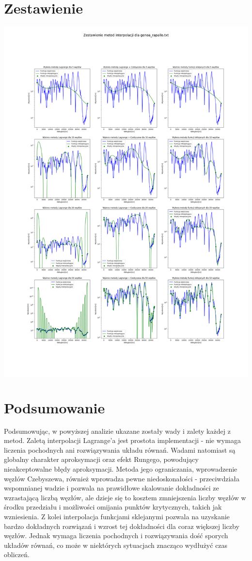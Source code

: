 \documentclass[a4paper,12pt]{article}
\begin{document}
\section{Zestawienie}
    \begin{center}
        \includegraphics[scale=0.3]{../charts/comparison_genoa_rapallo.png}
    \end{center}
    
\section{Podsumowanie}
	Podsumowując, w powyższej analizie ukazane zostały wady i zalety każdej z metod. Zaletą interpolacji Lagrange'a jest prostota implementacji - nie wymaga liczenia pochodnych ani rozwiązywania układu równań. Wadami natomiast są globalny charakter aproksymacji oraz efekt Rungego, powodujący nieakceptowalne błędy aproksymacji. Metoda jego ograniczania, wprowadzenie węzłów Czebyszewa, również wprowadza pewne niedoskonałości - przeciwdziała wspomnianej wadzie i pozwala na prawidłowe skalowanie dokładności ze wzrastającą liczbą węzłów, ale dzieje się to kosztem zmniejszenia liczby węzłów w środku przedziału i możliwości omijania punktów krytycznych, takich jak wzniesienia. Z kolei interpolacja funkcjami sklejanymi pozwala na uzyskanie bardzo dokładnych rozwiązań i wzrost tej dokładności dla coraz większej liczby węzłów. Jednak wymaga liczenia pochodnych i rozwiązywania dość sporych układów równań, co może w niektórych sytuacjach znacząco wydłużyć czas obliczeń.
\end{document}
